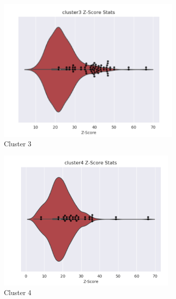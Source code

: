 \begin{figure}[htb]
\begin{subfigure}{0.2\textwidth}
  \includegraphics[width=\linewidth]{Pfam/cl03.png}
  \caption{Cluster 3}
  \label{fig:cl03}
\end{subfigure}\hfil %
\begin{subfigure}{0.2\textwidth}
  \includegraphics[width=\linewidth]{Pfam/cl04.png}
  \caption{Cluster 4}
  \label{fig:cl04}
\end{subfigure}\hfil %
\begin{subfigure}{0.2\textwidth}
  

\end{subfigure}
\end{figure}
